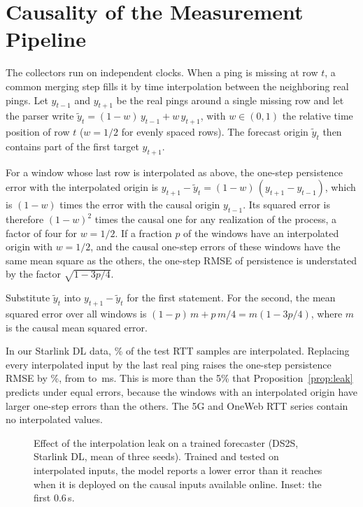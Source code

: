 \section{Causality of the Measurement Pipeline}
\label{sec:causal}
The collectors run on independent clocks. When a ping is missing at row $t$, a common merging step fills it by time interpolation between the neighboring real pings. Let $y_{t-1}$ and $y_{t+1}$ be the real pings around a single missing row and let the parser write $\tilde{y}_t=(1-w)\,y_{t-1}+w\,y_{t+1}$, with $w\in(0,1)$ the relative time position of row $t$ ($w=1/2$ for evenly spaced rows). The forecast origin $\tilde{y}_t$ then contains part of the first target $y_{t+1}$.

\begin{proposition}
\label{prop:leak}
For a window whose last row is interpolated as above, the one-step persistence error with the interpolated origin is $y_{t+1}-\tilde{y}_t=(1-w)\,(y_{t+1}-y_{t-1})$, which is $(1-w)$ times the error with the causal origin $y_{t-1}$. Its squared error is therefore $(1-w)^2$ times the causal one for any realization of the process, a factor of four for $w=1/2$. If a fraction $p$ of the windows have an interpolated origin with $w=1/2$, and the causal one-step errors of these windows have the same mean square as the others, the one-step RMSE of persistence is understated by the factor $\sqrt{1-3p/4}$.
\end{proposition}
\begin{IEEEproof}
Substitute $\tilde{y}_t$ into $y_{t+1}-\tilde{y}_t$ for the first statement. For the second, the mean squared error over all windows is $(1-p)\,m+p\,m/4=m(1-3p/4)$, where $m$ is the causal mean squared error.
\end{IEEEproof}

In our Starlink DL data, \InterpFracSLDL\% of the test RTT samples are interpolated. Replacing every interpolated input by the last real ping raises the one-step persistence RMSE by \AuditPersHonePct\%, from \AuditPersLegacyHone{} to \AuditPersCausalHone\,ms. This is more than the 5\% that Proposition~\ref{prop:leak} predicts under equal errors, because the windows with an interpolated origin have larger one-step errors than the others. The 5G and OneWeb RTT series contain no interpolated values.

\begin{figure}[t]
  \centering
  
  \caption{Effect of the interpolation leak on a trained forecaster (DS2S, Starlink DL, mean of three seeds). Trained and tested on interpolated inputs, the model reports a lower error than it reaches when it is deployed on the causal inputs available online. Inset: the first 0.6\,s.}
  \label{fig:leak}
\end{figure}

